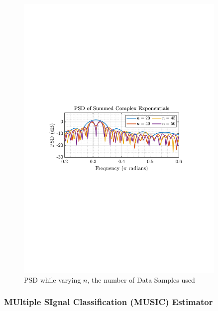 \documentclass[12pt]{article}
\begin{document}
	\begin{figure}[H]
		\centering
		\includegraphics[trim={2.2cm 11.2cm 3.15cm  11.2cm}, clip, width=0.9\textwidth]{../MATLAB/figures/q1_3d_fig01.pdf} 
		\captionsetup{justification=centering}
		\caption{PSD while varying $n$, the number of Data Samples used}
		\label{fig: 1-3d}
	\end{figure}	
	
	\subsubsection{MUltiple SIgnal Classification (MUSIC) Estimator}
	
\end{document}
